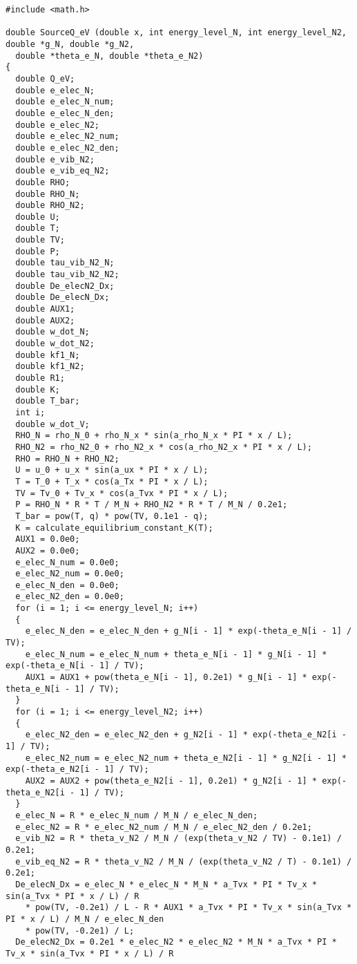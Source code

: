 \documentclass[10pt]{article}
\begin{document}
\begin{footnotesize} 
\begin{verbatim}
#include <math.h>

double SourceQ_eV (double x, int energy_level_N, int energy_level_N2, double *g_N, double *g_N2, 
  double *theta_e_N, double *theta_e_N2)
{
  double Q_eV;
  double e_elec_N;
  double e_elec_N_num;
  double e_elec_N_den;
  double e_elec_N2;
  double e_elec_N2_num;
  double e_elec_N2_den;
  double e_vib_N2;
  double e_vib_eq_N2;
  double RHO;
  double RHO_N;
  double RHO_N2;
  double U;
  double T;
  double TV;
  double P;
  double tau_vib_N2_N;
  double tau_vib_N2_N2;
  double De_elecN2_Dx;
  double De_elecN_Dx;
  double AUX1;
  double AUX2;
  double w_dot_N;
  double w_dot_N2;
  double kf1_N;
  double kf1_N2;
  double R1;
  double K;
  double T_bar;
  int i;
  double w_dot_V;
  RHO_N = rho_N_0 + rho_N_x * sin(a_rho_N_x * PI * x / L);
  RHO_N2 = rho_N2_0 + rho_N2_x * cos(a_rho_N2_x * PI * x / L);
  RHO = RHO_N + RHO_N2;
  U = u_0 + u_x * sin(a_ux * PI * x / L);
  T = T_0 + T_x * cos(a_Tx * PI * x / L);
  TV = Tv_0 + Tv_x * cos(a_Tvx * PI * x / L);
  P = RHO_N * R * T / M_N + RHO_N2 * R * T / M_N / 0.2e1;
  T_bar = pow(T, q) * pow(TV, 0.1e1 - q);
  K = calculate_equilibrium_constant_K(T);
  AUX1 = 0.0e0;
  AUX2 = 0.0e0;
  e_elec_N_num = 0.0e0;
  e_elec_N2_num = 0.0e0;
  e_elec_N_den = 0.0e0;
  e_elec_N2_den = 0.0e0;
  for (i = 1; i <= energy_level_N; i++)
  {
    e_elec_N_den = e_elec_N_den + g_N[i - 1] * exp(-theta_e_N[i - 1] / TV);
    e_elec_N_num = e_elec_N_num + theta_e_N[i - 1] * g_N[i - 1] * exp(-theta_e_N[i - 1] / TV);
    AUX1 = AUX1 + pow(theta_e_N[i - 1], 0.2e1) * g_N[i - 1] * exp(-theta_e_N[i - 1] / TV);
  }
  for (i = 1; i <= energy_level_N2; i++)
  {
    e_elec_N2_den = e_elec_N2_den + g_N2[i - 1] * exp(-theta_e_N2[i - 1] / TV);
    e_elec_N2_num = e_elec_N2_num + theta_e_N2[i - 1] * g_N2[i - 1] * exp(-theta_e_N2[i - 1] / TV);
    AUX2 = AUX2 + pow(theta_e_N2[i - 1], 0.2e1) * g_N2[i - 1] * exp(-theta_e_N2[i - 1] / TV);
  }
  e_elec_N = R * e_elec_N_num / M_N / e_elec_N_den;
  e_elec_N2 = R * e_elec_N2_num / M_N / e_elec_N2_den / 0.2e1;
  e_vib_N2 = R * theta_v_N2 / M_N / (exp(theta_v_N2 / TV) - 0.1e1) / 0.2e1;
  e_vib_eq_N2 = R * theta_v_N2 / M_N / (exp(theta_v_N2 / T) - 0.1e1) / 0.2e1;
  De_elecN_Dx = e_elec_N * e_elec_N * M_N * a_Tvx * PI * Tv_x * sin(a_Tvx * PI * x / L) / R 
    * pow(TV, -0.2e1) / L - R * AUX1 * a_Tvx * PI * Tv_x * sin(a_Tvx * PI * x / L) / M_N / e_elec_N_den 
    * pow(TV, -0.2e1) / L;
  De_elecN2_Dx = 0.2e1 * e_elec_N2 * e_elec_N2 * M_N * a_Tvx * PI * Tv_x * sin(a_Tvx * PI * x / L) / R 

\end{verbatim}
\end{footnotesize}
\end{document}
